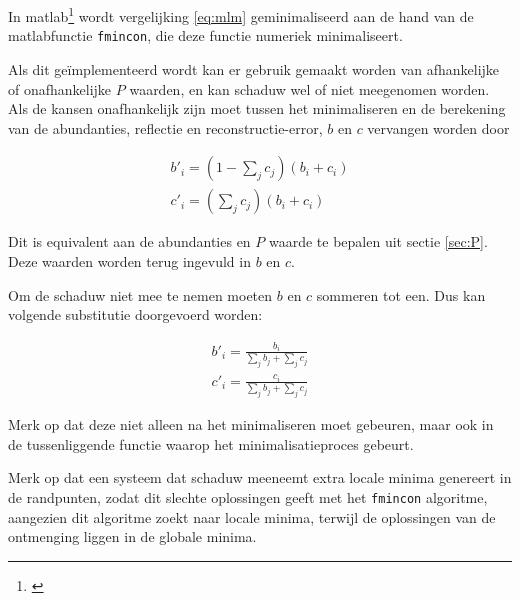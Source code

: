 \documentclass[12pt]{report}
\newcommand{\footcite}[1]{\cite{#1}\let\thefootnote\relax \footnote{\cite{#1} \bibentry{#1}} }
\begin{document}
In matlab\footcite{MATLAB:2010} wordt vergelijking \ref{eq:mlm} geminimaliseerd aan de hand van de matlabfunctie \texttt{fmincon}, die deze functie numeriek minimaliseert.

Als dit ge\"implementeerd wordt kan er gebruik gemaakt worden van afhankelijke of onafhankelijke $P$ waarden, en kan schaduw wel of niet meegenomen worden. Als de kansen onafhankelijk zijn moet tussen het minimaliseren en de berekening van de abundanties, reflectie en reconstructie-error, $b$ en $c$ vervangen worden door

\begin{align}
b'_i = \left(1-\sum_j c_j\right) (b_i + c_i)  \\
c'_i = \left(\sum_j c_j\right) (b_i + c_i)
\end{align}

Dit is equivalent aan de abundanties en $P$ waarde te bepalen uit sectie \ref{sec:P}. Deze waarden worden terug ingevuld in $b$ en $c$. 

Om de schaduw niet mee te nemen moeten $b$ en $c$ sommeren tot een. Dus kan volgende substitutie doorgevoerd worden:

\begin{align}
b'_i = \frac{b_i}{\sum_j b_j + \sum_j c_j} \\
c'_i = \frac{c_i}{\sum_j b_j + \sum_j c_j}
\end{align}

Merk op dat deze niet alleen na het minimaliseren moet gebeuren, maar ook in de tussenliggende functie waarop het minimalisatieproces gebeurt.

Merk op dat een systeem dat schaduw meeneemt extra locale minima genereert in de randpunten, zodat dit slechte oplossingen geeft met het \texttt{fmincon} algoritme, aangezien dit algoritme zoekt naar locale minima, terwijl de oplossingen van de ontmenging liggen in de globale minima. 



\end{document}
